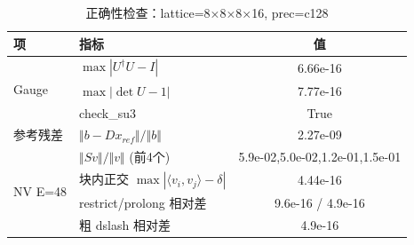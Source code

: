 \begin{table}[h]\centering
\begin{tabular}{llc}
\toprule
项 & 指标 & 值 \\
\midrule
\multirow{3}{*}{Gauge} & $\max|U^\dagger U-I|$ & 6.66e-16 \\
& $\max|\det U - 1|$ & 7.77e-16 \\
& check\_su3 & True \\
参考残差 & $\Vert b-D x_{ref}\Vert/\Vert b\Vert$ & 2.27e-09 \\
\multirow{4}{*}{NV E=48}
& $\Vert S v\Vert/\Vert v\Vert$ (前4个) & 5.9e-02,5.0e-02,1.2e-01,1.5e-01 \\
& 块内正交 $\max|\langle v_i,v_j\rangle-\delta|$ & 4.44e-16 \\
& restrict/prolong 相对差 & 9.6e-16 / 4.9e-16 \\
& 粗 dslash 相对差 & 4.9e-16 \\
\bottomrule
\end{tabular}
\caption{正确性检查：lattice=8×8×8×16, prec=c128}
\end{table}
